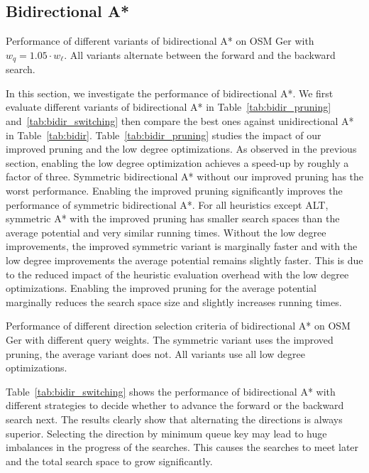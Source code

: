 \documentclass[manuscript,review]{acmart}
\begin{document}
\subsection{Bidirectional A*}

\begin{table}
\centering
\caption{
Performance of different variants of bidirectional A* on OSM Ger with $w_q = 1.05 \cdot w_\ell$.
All variants alternate between the forward and the backward search.}
\label{tab:bidir_pruning}

\end{table}

In this section, we investigate the performance of bidirectional A*.
We first evaluate different variants of bidirectional A* in Table~\ref{tab:bidir_pruning} and~\ref{tab:bidir_switching} then compare the best ones against unidirectional A* in Table~\ref{tab:bidir}.
Table~\ref{tab:bidir_pruning} studies the impact of our improved pruning and the low degree optimizations.
As observed in the previous section, enabling the low degree optimization achieves a speed-up by roughly a factor of three.
Symmetric bidirectional A* without our improved pruning has the worst performance.
Enabling the improved pruning significantly improves the performance of symmetric bidirectional A*.
For all heuristics except ALT, symmetric A* with the improved pruning has smaller search spaces than the average potential and very similar running times.
Without the low degree improvements, the improved symmetric variant is marginally faster and with the low degree improvements the average potential remains slightly faster.
This is due to the reduced impact of the heuristic evaluation overhead with the low degree optimizations.
Enabling the improved pruning for the average potential marginally reduces the search space size and slightly increases running times.

\begin{table}
\centering
\caption{
Performance of different direction selection criteria of bidirectional A* on OSM Ger with different query weights.
The symmetric variant uses the improved pruning, the average variant does not.
All variants use all low degree optimizations.
}\label{tab:bidir_switching}

\end{table}

Table~\ref{tab:bidir_switching} shows the performance of bidirectional A* with different strategies to decide whether to advance the forward or the backward search next.
The results clearly show that alternating the directions is always superior.
Selecting the direction by minimum queue key may lead to huge imbalances in the progress of the searches.
This causes the searches to meet later and the total search space to grow significantly.
\end{document}
